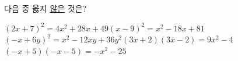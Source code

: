 다음 중 옳지 \underline{않은} 것은?
\begin{choicesv}{$(2x+7)^2=4x^2+28x+49$}{$(x-9)^2=x^2-18x+81$}{$(-x+6y)^2=x^2-12xy+36y^2$}{$(3x+2)(3x-2)=9x^2-4$}{$(-x+5)(-x-5)=-x^2-25$}\end{choicesv}

